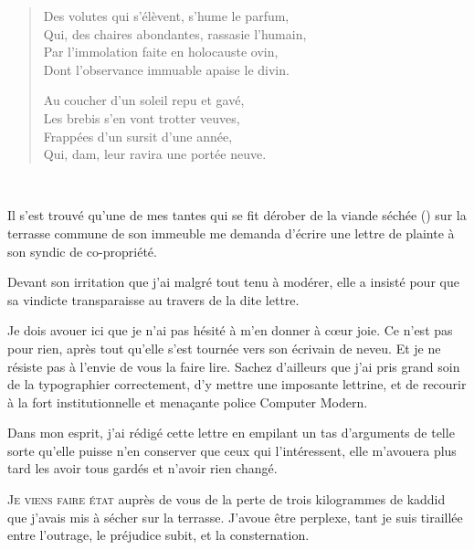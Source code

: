 \begin{verse}
  Des volutes qui s’élèvent, s’hume le parfum,\\
  Qui, des chaires abondantes, rassasie l’humain,\\
  Par l’immolation faite en holocauste ovin,\\
  Dont l’observance immuable apaise le divin.

  Au coucher d’un soleil repu et gavé,\\
  Les brebis s’en vont trotter veuves,\\
  Frappées d’un sursit d’une année,\\
  Qui, dam, leur ravira une portée neuve.\\
\end{verse}

\pagebreak
\thispagestyle{empty}
~
\vfill
\pagebreak

\begin{prose}
  Il s’est trouvé qu’une de mes tantes qui se
  fit dérober de la viande séchée () sur la terrasse commune de son immeuble
  me demanda d’écrire une lettre de plainte à son syndic de co-propriété.

  Devant son irritation que j’ai malgré tout tenu  à modérer, elle a insisté pour que sa vindicte transparaisse au travers de la dite lettre.

  Je dois avouer ici que je n’ai pas hésité à m’en donner à cœur joie. Ce n’est pas pour rien, après tout qu’elle s’est tournée vers son écrivain de neveu. Et je ne résiste pas à l’envie de vous la faire lire. Sachez d’ailleurs que j’ai pris grand soin de la typographier correctement, d’y mettre une imposante lettrine, et de recourir à la fort institutionnelle et menaçante police Computer Modern.

  Dans mon esprit, j’ai rédigé cette lettre en empilant un tas d’arguments de telle sorte qu’elle puisse n’en conserver que ceux qui l’intéressent, elle m’avouera plus tard les avoir tous gardés et n’avoir rien changé.
\end{prose}

\lettrine[lines=3]{J}{e viens faire état} auprès de vous de la perte de trois kilogrammes de kaddid que j’avais mis à sécher sur la terrasse.
%
J’avoue être perplexe, tant je suis tiraillée entre l’outrage, le préjudice subit, et la consternation.

